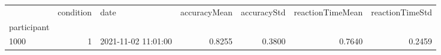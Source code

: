 \begin{tabular}{lrlrrrr}
\toprule
{} &  condition &                 date &  accuracyMean &  accuracyStd &  reactionTimeMean &  reactionTimeStd \\
participant &            &                      &               &              &                   &                  \\
\midrule
1000        &          1 &  2021-11-02 11:01:00 &        0.8255 &       0.3800 &            0.7640 &           0.2459 \\
\bottomrule
\end{tabular}
